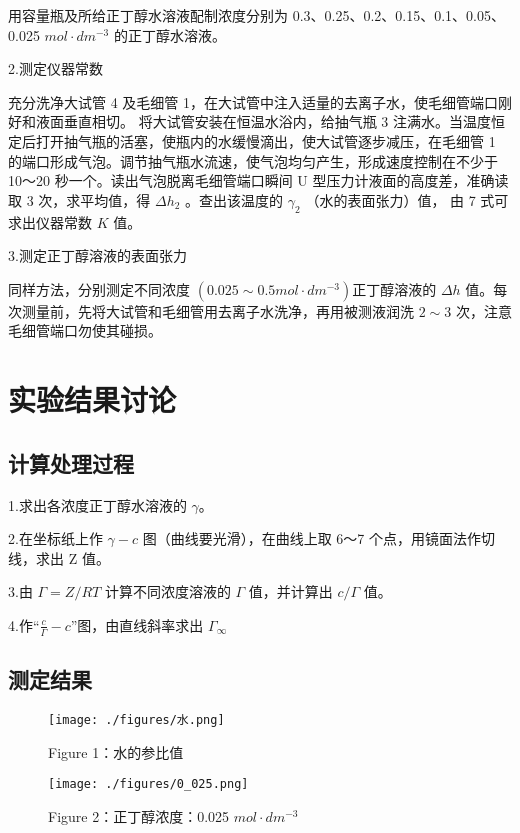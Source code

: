 \documentclass[4pt,a4papper]{article}
\begin{document}
用容量瓶及所给正丁醇水溶液配制浓度分别为 0.3、0.25、0.2、0.15、0.1、0.05、0.025 $mol·dm^{-3}$ 的正丁醇水溶液。

2.测定仪器常数

充分洗净大试管 4 及毛细管 1，在大试管中注入适量的去离子水，使毛细管端口刚好和液面垂直相切。 将大试管安装在恒温水浴内，给抽气瓶 3 注满水。当温度恒定后打开抽气瓶的活塞，使瓶内的水缓慢滴出，使大试管逐步减压，在毛细管 1 的端口形成气泡。调节抽气瓶水流速，使气泡均匀产生，形成速度控制在不少于 10～20 秒一个。读出气泡脱离毛细管端口瞬间 U 型压力计液面的高度差，准确读取 3 次，求平均值，得 $\Delta h_2$ 。查出该温度的 $\gamma_2$ （水的表面张力）值， 由 7 式可求出仪器常数 $K$ 值。

3.测定正丁醇溶液的表面张力

同样方法，分别测定不同浓度 $(0.025 \sim 0.5 mol·dm^{-3})$正丁醇溶液的 $\Delta h$ 值。每次测量前，先将大试管和毛细管用去离子水洗净，再用被测液润洗 $2 \sim 3$ 次，注意毛细管端口勿使其碰损。



\section{实验结果讨论}
\subsection{计算处理过程}
1.求出各浓度正丁醇水溶液的 $\gamma$。 

2.在坐标纸上作 $\gamma - c$ 图（曲线要光滑），在曲线上取 6～7 个点，用镜面法作切线，求出 Z 值。

3.由 $\Gamma = Z/RT$ 计算不同浓度溶液的 $\Gamma$ 值，并计算出 $c/\Gamma$ 值。

4.作“$\frac{c}{\Gamma} - c$”图，由直线斜率求出 $\Gamma_{\infty}$

\subsection{测定结果}
    \begin{figure}[htbp]
        \centering
        \texttt{[image: ./figures/水.png]}
        \caption{Figure 1：水的参比值} \label{fig:1}
    \end{figure}

    \begin{figure}[htbp]
        \centering
        \texttt{[image: ./figures/0\_025.png]}
        \caption{Figure 2：正丁醇浓度：0.025 $mol·dm^{-3}$} \label{fig:2}
    \end{figure}
\end{document}
